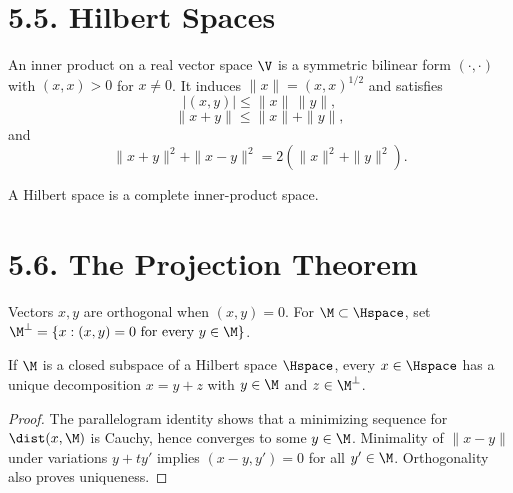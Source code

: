 \section*{5.5. Hilbert Spaces}

\begin{definition}\label{gt.def5.5.inner-product}
An inner product on a real vector space $\V$ is a symmetric bilinear form
$(\cdot,\cdot)$ with $(x,x)>0$ for $x\neq0$. It induces
$\|x\|=(x,x)^{1/2}$ and satisfies
\begin{equation}\label{gt.eq5.7}
|(x,y)|\leq\|x\|\,\|y\|,
\end{equation}
\begin{equation}\label{gt.eq5.8}
\|x+y\|\leq\|x\|+\|y\|,
\end{equation}
and
\begin{equation}\label{gt.eq5.9}
\|x+y\|^2+\|x-y\|^2=2(\|x\|^2+\|y\|^2).
\end{equation}
\end{definition}

\begin{definition}\label{gt.def5.5.hilbert-space}
A Hilbert space is a complete inner-product space.
\end{definition}

\section*{5.6. The Projection Theorem}

\begin{definition}\label{gt.def5.6.orthogonal}
Vectors $x,y$ are orthogonal when $(x,y)=0$. For $\M\subset\Hspace$, set
$\M^\perp=\{x:(x,y)=0\text{ for every }y\in\M\}$.
\end{definition}

\begin{theorem}\label{gt.thm5.6}
If $\M$ is a closed subspace of a Hilbert space $\Hspace$, every
$x\in\Hspace$ has a unique decomposition $x=y+z$ with
$y\in\M$ and $z\in\M^\perp$.
\end{theorem}
\begin{proof}
\sketch The parallelogram identity shows that a minimizing sequence for
$\dist(x,\M)$ is Cauchy, hence converges to some $y\in\M$. Minimality of
$\|x-y\|$ under variations $y+t y'$ implies $(x-y,y')=0$ for all
$y'\in\M$. Orthogonality also proves uniqueness.
\end{proof}

